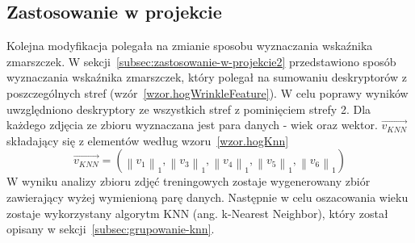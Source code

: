 \documentclass[a4paper,twoside,12pt]{book}
\begin{document}
    \subsection{Zastosowanie w projekcie}\label{subsec:zastosowanie-w-projekcie}
    Kolejna modyfikacja polegała na zmianie sposobu wyznaczania wskaźnika zmarszczek.
    W sekcji~\ref{subsec:zastosowanie-w-projekcie2} przedstawiono sposób wyznaczania wskaźnika zmarszczek,
    który polegał na sumowaniu deskryptorów z poszczególnych stref (wzór~\ref{wzor.hogWrinkleFeature}).
    W celu poprawy wyników uwzględniono deskryptory ze wszystkich stref z pominięciem strefy 2.
    Dla każdego zdjęcia ze zbioru wyznaczana jest para danych - wiek oraz wektor.
    $\overrightarrow{v_{KNN}}$ składający się z elementów według wzoru~\ref{wzor.hogKnn}
    \large
    \begin{equation}
        \overrightarrow{v_{KNN}} = (\left \|v_{1}  \right \|_{1},\left \|v_{3}  \right \|_{1},\left \|v_{4}  \right
        \|_{1},\left \|v_{5}  \right \|_{1},\left \|v_{6}  \right \|_{1})
        \label{wzor.hogKnn}
    \end{equation}
    \normalsize
    W wyniku analizy zbioru zdjęć treningowych zostaje wygenerowany zbiór zawierający wyżej wymienioną parę danych.
    Następnie w celu oszacowania wieku zostaje wykorzystany algorytm KNN (ang. k-Nearest Neighbor),
    który został opisany w sekcji~\ref{subsec:grupowanie-knn}.
\end{document}
